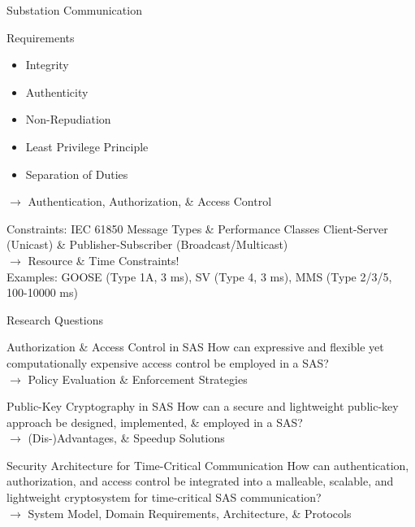 \documentclass[en]{sdqbeamer}
\begin{document}
\begin{frame}{Substation Communication}
    \begin{blueblock}{Requirements}
        \begin{itemize}
            \item Integrity
            \item Authenticity
            \item Non-Repudiation
            \item Least Privilege Principle
            \item Separation of Duties
        \end{itemize}
        $\rightarrow$ Authentication, Authorization, \& Access Control
    \end{blueblock}
    \begin{grayblock}{Constraints: IEC 61850 Message Types \& Performance Classes \parencite*{IEC61850P5,IEC61850P8}}
        Client-Server (Unicast) \& Publisher-Subscriber (Broadcast/Multicast) \\$\rightarrow$ Resource \& Time Constraints!
        \\Examples: GOOSE (Type 1A, 3 ms), SV (Type 4, 3 ms), MMS (Type 2/3/5, 100-10000 ms)
    \end{grayblock}
\end{frame}
\begin{frame}{Research Questions}
    \begin{greenblock}{Authorization \& Access Control in SAS}
        How can expressive and flexible yet computationally expensive access control be employed in a SAS?
        \\$\rightarrow$ Policy Evaluation \& Enforcement Strategies
    \end{greenblock}

    \begin{greenblock}{Public-Key Cryptography in SAS}
        How can a secure and lightweight public-key approach be designed, implemented, \& employed in a SAS?
        \\$\rightarrow$ (Dis-)Advantages, \& Speedup Solutions
    \end{greenblock}

    \begin{greenblock}{Security Architecture for Time-Critical Communication}
        How can authentication, authorization, and access control be integrated into a malleable, scalable, and lightweight cryptosystem for time-critical SAS communication?
        \\$\rightarrow$ System Model, Domain Requirements, Architecture, \& Protocols
    \end{greenblock}
\end{frame}
\end{document}
